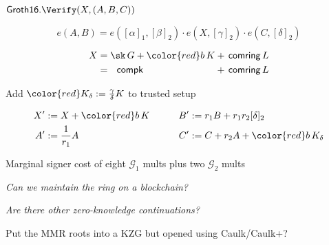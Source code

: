 \documentclass{beamer}
\def\comring{\ensuremath{\mathsf{comring}}\xspace}
\def\compk{\ensuremath{\mathsf{compk}}\xspace}
\begin{document}
\begin{frame}[t] %

$\mathsf{Groth16}.\Verify(X,(A,B,C))$

$$ e(A,B) = e([\alpha]_1, [\beta]_2) \cdot e(X, [\gamma]_2) \cdot e(C, [\delta]_2) $$

\smallskip

$$ \begin{alignedat}{2}
 X &= \sk \, G + {\color{red} b \, K} &&+ \, \comring \, L \\
   &= \, \, \, \, \compk  &&+ \, \comring \, L \\
\end{alignedat} $$

\bigskip

Add $\color{red} K_\delta := {\gamma\over\delta} K$ to trusted setup

$$ \begin{aligned}
X' &:= X + {\color{red} b\, K} &\quad&&
B' &:= r_1 B + r_1 r_2 [\delta]_2 \\
A' &:= {1 \over r_1} A & &&
C' &:= C + r_2 A + {\color{red} b\, K_\delta} \\
\end{aligned} $$

\bigskip\bigskip

\hspace{5pt} Marginal signer cost of eight $\mathcal{G}_1$ mults plus two $\mathcal{G}_2$ mults 


\end{frame}




\begin{frame} %

 {\it Can we maintain the ring on a blockchain?}

\bigskip\medskip

\hspace{5pt} {\it Are there other zero-knowledge continuations?}

\bigskip\bigskip

Put the MMR roots into a KZG but opened using Caulk/Caulk+?

\end{frame}
\end{document}
